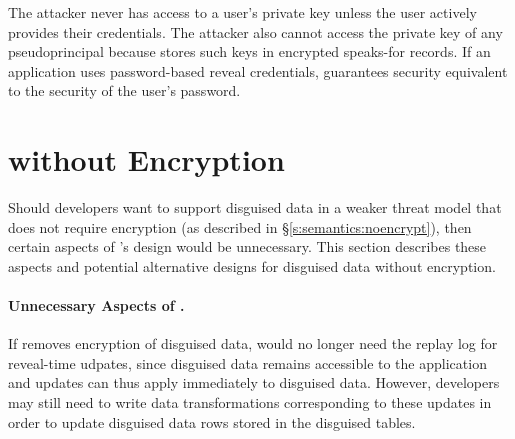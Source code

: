 %
%
The attacker never has access to a user's private key unless the user actively
provides their credentials.
%
The attacker also cannot access the private key of any pseudoprincipal because
\sys stores such keys in encrypted speaks-for records.
%
%
If an application uses password-based reveal credentials, \sys
guarantees security equivalent to the security of the user's password.

\section{\sys without Encryption}
\label{s:noencrypt}

%

Should developers want to support disguised data in a weaker threat model that
does not require encryption (as described in \S\ref{s:semantics:noencrypt}),
then certain aspects of \sys's design would be unnecessary. This section
describes these aspects and potential
alternative designs for disguised data without encryption. 

\paragraph{Unnecessary Aspects of \sys.}
If \sys removes encryption of disguised data, \sys would no longer need the
replay log for reveal-time udpates, since disguised data remains accessible to
the application and updates can thus apply immediately to disguised data.
However, developers may still need to write data transformations corresponding
to these updates in order to update disguised data rows stored in the disguised
tables.
%

